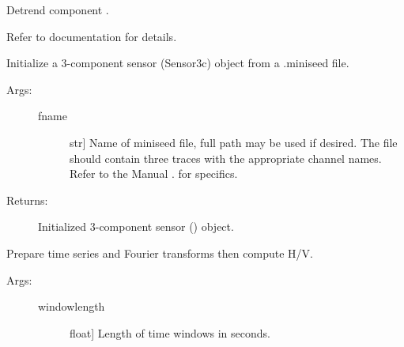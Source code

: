 \documentclass[letterpaper,10pt,english,openany,oneside]{sphinxmanual}
\begin{document}
\begin{fulllineitems}

\begin{fulllineitems}
\label{\detokenize{index:hvsrpy.Sensor3c.detrend}}
Detrend component .

Refer to  documentation for details.

\end{fulllineitems}


\begin{fulllineitems}
\label{\detokenize{index:hvsrpy.Sensor3c.from_mseed}}
Initialize a 3-component sensor (Sensor3c) object from a
.miniseed file.
\begin{description}
\item[{Args:}] \leavevmode\begin{description}
\item[{fname}] \leavevmode{[}str{]}
Name of miniseed file, full path may be used if desired.
The file should contain three traces with the 
appropriate channel names. Refer to the  Manual 
.
for specifics.

\end{description}

\item[{Returns:}] \leavevmode
Initialized 3-component sensor () object.

\end{description}

\end{fulllineitems}


\begin{fulllineitems}
\label{\detokenize{index:hvsrpy.Sensor3c.hv}}
Prepare time series and Fourier transforms then compute H/V.
\begin{description}
\item[{Args:}] \leavevmode\begin{description}
\item[{windowlength}] \leavevmode{[}float{]}
Length of time windows in seconds.


\end{description}
\end{description}
\end{fulllineitems}
\end{fulllineitems}
\end{document}
